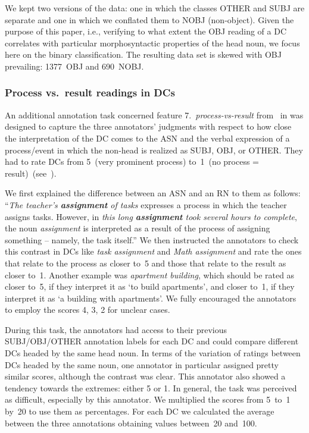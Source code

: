 \documentclass[output=paper]{langsci/langscibook}
\begin{document}
We kept two versions of the data: one in which  {the classes} OTHER and SUBJ are separate and one in which we conflated them to NOBJ (non-object). Given the purpose of this paper, i.e., verifying to what extent the OBJ reading of a DC correlates with particular morphosyntactic properties of the head noun, we focus here on the binary classification. The resulting data set is skewed with OBJ prevailing: 1377~OBJ and 690~NOBJ.

\subsubsection{Process vs.\ result readings in DCs}\label{sec:annotation:p-r}
An additional annotation task concerned feature 7.~\textit{process-vs-result} from~ in  was designed to capture the three annotators' judgments with respect to how close the interpretation of the DC comes to the ASN and the verbal expression of a process/event in which the non-head is realized as SUBJ, OBJ, or OTHER.
They had to rate DCs from 5~(very prominent process) to~1~(no process = result)~(see~\citealt{grimshaw:90}). 

We first explained the difference between an ASN and an RN to them as follows: ``\textit{The teacher's \textbf{assignment} of tasks} expresses a process in which the teacher assigns tasks.
However, in \textit{this long \textbf{assignment} took several hours to complete}, the noun \textit{assignment} is interpreted as a result of the process of assigning something -- namely, the task itself.''
We then instructed the annotators to check this contrast in DCs like \textit{task assignment} and \textit{Math assignment} and rate the ones that relate to the process as closer to~5 and those that relate to the result as closer to~1. Another example was \textit{apartment building}, which should be rated as closer to~5, if they interpret it as \lq to build apartments\rq, and closer to~1, if they  interpret it as \lq a building with apartments\rq. We fully encouraged the annotators to employ the scores 4, 3, 2 for unclear cases. 
 
During this task, the annotators had access to their previous  {SUBJ/OBJ/OTHER annotation} labels  for each DC and could compare different DCs headed by the same head noun. In terms of the variation of ratings between DCs headed by the same noun, one annotator in particular assigned pretty similar scores, although the contrast was clear. This annotator also showed a  tendency towards the extremes: either 5 or 1. In general, the task was perceived as difficult, especially by this annotator. We multiplied the scores from 5~to~1 by~20 to use them as percentages. For each DC we calculated the average between the three annotations obtaining values between~20 and~100. 
 
\end{document}
